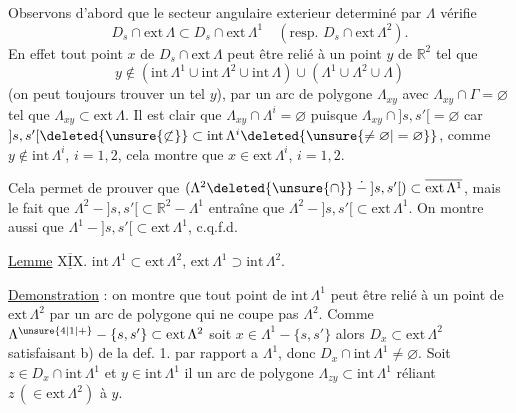 Observons d'abord que le secteur angulaire exterieur  determiné par $\Lambda$ vérifie
\[
D_s\cap\mathrm{ext}\,\Lambda\subset D_s\cap\mathrm{ext}\,\Lambda^{1}\quad(\text{resp. }D_s\cap\mathrm{ext}\,\Lambda^{2}).
\]
En effet tout point $x$ de $D_s\cap\mathrm{ext}\,\Lambda$ peut être relié à un point $y$ de $\mathbb{R}^{2}$ tel que
\[
y\notin(\mathrm{int}\,\Lambda^{1}\cup\mathrm{int}\,\Lambda^{2}\cup\mathrm{int}\,\Lambda)\cup(\Lambda^{1}\cup\Lambda^{2}\cup\Lambda)
\]
 (on peut toujours trouver un tel $y$), par un arc de polygone $\Lambda_{xy}$ avec $\Lambda_{xy}\cap\Gamma=\varnothing$  tel que $\Lambda_{xy}\subset\mathrm{ext}\,\Lambda$. Il est clair que $\Lambda_{xy}\cap\Lambda^{i}=\varnothing$ puisque $\Lambda_{xy}\cap{]s,s'[}=\varnothing$ car $ {]s,s'[}\deleted{\unsure{\not\subset}}\subset\mathrm{int}\,\Lambda^{i}\deleted{\unsure{\ne\varnothing|=\varnothing}}$, comme $y\notin\mathrm{int}\,\Lambda^{i}$, $i=1,2$, cela montre que $x\in\mathrm{ext}\,\Lambda^{i}$, $i=1,2$.

Cela permet de prouver que $(\Lambda^{2}\deleted{\unsure{\cap}}\mathbin{\dot{-}}{]s,s'[})\subset\overline{\mathrm{ext}\,\Lambda^{1}}$, mais le fait que $\Lambda^{2}-{]s,s'[}\subset\mathbb{R}^{2}-\Lambda^{1}$ entraîne que $\Lambda^{2}-{]s,s'[}\subset\mathrm{ext}\,\Lambda^{1}$. On montre aussi  que $\Lambda^{1}-{]s,s'[}\subset\mathrm{ext}\,\Lambda^{1}$, c.q.f.d.

\uline{Lemme} $\underline{\overline{\mathrm{XIX}}}$. $\mathrm{int}\,\Lambda^{1}\subset\mathrm{ext}\,\Lambda^{2}$, $\mathrm{ext}\,\Lambda^{1}\supset\mathrm{int}\,\Lambda^{2}$.

\uline{Demonstration} : on montre que tout point de $\mathrm{int}\,\Lambda^{1}$ peut être relié à un point de $\mathrm{ext}\,\Lambda^{2}$ par un arc de polygone qui ne coupe pas $\Lambda^{2}$. Comme $\Lambda^{\unsure{4|1|+}}-\{s,s'\}\subset\mathrm{ext}\,\Lambda^{2}$ soit $x\in\Lambda^{1}-\{s,s'\}$ alors  $D_x\subset\mathrm{ext}\,\Lambda^{2}$ satisfaisant b) de la def. 1. par rapport a $\Lambda^{1}$, donc $D_x\cap\mathrm{int}\,\Lambda^{1}\ne\varnothing$. Soit $z\in D_x\cap\mathrm{int}\,\Lambda^{1}$ et $y\in\mathrm{int}\,\Lambda^{1}$ il  un arc de polygone $\Lambda_{zy}\subset\mathrm{int}\,\Lambda^{1}$ réliant $z\,(\in\mathrm{ext}\,\Lambda^{2})$ à $y$.

